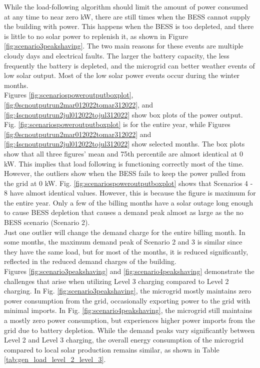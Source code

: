 \documentclass[conference]{IEEEtran}
\begin{document}
	While the load-following algorithm should limit the amount of power consumed at any time to near zero kW, there are still times when the BESS cannot supply the building with power. This happens when the BESS is too depleted, and there is little to no solar power to replenish it, as shown in Figure \ref{fig:scenario3peakshaving}. The two main reasons for these events are multiple cloudy days and electrical faults. The larger the battery capacity, the less frequently the battery is depleted, and the microgrid can better weather events of low solar output. Most of the low solar power events occur during the winter months.\\
	\indent Figures \ref{fig:scenariospoweroutputboxplot}, \ref{fig:0scnoutputrun2mar012022tomar312022}, and \ref{fig:4scnoutputrun2jul012022tojul312022} show box plots of the power output. Fig. \ref{fig:scenariospoweroutputboxplot} is for the entire year, while Figures \ref{fig:0scnoutputrun2mar012022tomar312022} and \ref{fig:4scnoutputrun2jul012022tojul312022} show selected months. The box plots show that all three figures' mean and 75th percentile are almost identical at 0 kW. This implies that load following is functioning correctly most of the time. However, the outliers show when the BESS fails to keep the power pulled from the grid at 0 kW. Fig. \ref{fig:scenariospoweroutputboxplot} shows that Scenarios 4 - 8 have almost identical values. However, this is because the figure is maximum for the entire year. Only a few of the billing months have a solar outage long enough to cause BESS depletion that causes a demand peak almost as large as the no BESS scenario (Scenario 2).\\
	\indent Just one outlier will change the demand charge for the entire billing month. In some months, the maximum demand peak of Scenario 2 and 3 is similar since they have the same load, but for most of the months, it is reduced significantly, reflected in the reduced demand charges of the building. \\ 
	\indent Figures \ref{fig:scenario3peakshaving} and \ref{fig:scenario4peakshaving} demonstrate the challenges that arise when utilizing Level 3 charging compared to Level 2 charging. In Fig. \ref{fig:scenario3peakshaving}, the microgrid mostly maintains zero power consumption from the grid, occasionally exporting power to the grid with minimal imports. In Fig. \ref{fig:scenario4peakshaving}, the microgrid still maintains a mostly zero power consumption, but experiences higher power imports from the grid due to battery depletion. While the demand peaks vary significantly between Level 2 and Level 3 charging, the overall energy consumption of the microgrid compared to local solar production remains similar, as shown in Table \ref{tab:gen_load_level_2_level_3}.\\
\end{document}
